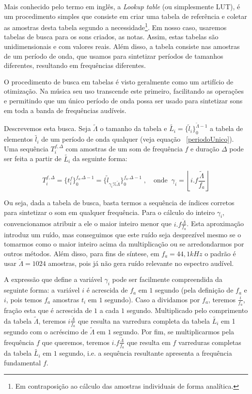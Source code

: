 Mais conhecido pelo termo em inglês, a \emph{Lookup table} (ou simplesmente
LUT), é um procedimento simples que consiste em criar uma tabela
de referência e coletar as amostras desta tabela segundo a 
necessidade\footnote{Em contraposição ao cálculo das amostras individuais
de forma analítica.}. Em nosso caso, usaremos tabelas de busca para os
sons criados, as notas. Assim, estas tabelas são unidimensionais e com
valores reais. Além disso, a tabela consiste nas amostras
de um período de onda, que usamos para sintetizar períodos
de tamanhos diferentes, resultando em frequências diferentes.

O procedimento de busca em tabelas é visto geralmente como um
artifício de otimização. Na música seu uso transcende este
primeiro, facilitando as operações e permitindo que um único
período de onda possa ser usado para sintetizar sons em toda a banda
de frequências audíveis.

Descrevemos esta busca. Seja $\widetilde{\Lambda}$ o tamanho 
da tabela e $\widetilde{L_i} = \{ \widetilde{l}_i \}_0^{\widetilde{\Lambda} -1}$ a tabela de elementos $\widetilde{l_i}$ de um
período de onda qualquer (veja equação ~\ref{periodoUnico}). Uma sequência
$T_i^{f,\Delta}$ com amostras de um som de frequência $f$ e duração $\Delta$
pode ser feita a partir de $\widetilde{L_i}$ da seguinte forma:

\begin{equation}
T_i^{f,\Delta}=\{t_i^f\}_0^{f_a . \Delta-1} = \{ \widetilde{l}_{\gamma_i \% \widetilde{\Lambda} } \}_{0}^{f_a . \Delta-1}\; , \quad \text{onde} \;\; \gamma_i = \left \lfloor i . f \frac{ \widetilde{\Lambda}}{f_a} \right \rfloor  
\end{equation}

Ou seja, dada a tabela de busca, basta termos a sequência de índices corretos
para sintetizar o som em qualquer frequência. Para o cálculo do inteiro $\gamma_i$, convencionamos
atribuir a ele o maior inteiro menor que $i.f\frac{\widetilde{\Lambda}}{f_a}$.
Esta aproximação introduz um ruído, mas conseguimos que este ruído seja desprezível
mesmo se o tomarmos como o maior inteiro acima da multiplicação
ou se arredondarmos por outros métodos. Além disso, para fins de síntese, em $f_a=44,1 kHz$
 o padrão é usar $\widetilde{\Lambda} = 1024$ amostras, pois já não gera ruído
 relevante no espectro audível.

 A expressão que define a variável $\gamma_i$ pode ser facilmente compreendida da
 seguinte forma: a variável $i$ é acrescida de $f_a$ em $1$ segundo (pela
 definição de $f_a$ e $i$, pois temos $f_a$ amostras $t_i$ em $1$ segundo). Caso a dividamos por $f_a$, teremos $\frac{i}{f_a}$,
fração esta que é acrescida de $1$ a cada $1$ segundo. Multiplicado pelo comprimento da
 tabela $\widetilde{\Lambda}$, teremos $i \frac{\widetilde{\Lambda}}{f_a}$
 que resulta na varredura completa da tabela $\widetilde{L_i}$ em 
 1 segundo com o acréscimo de $\widetilde{\Lambda}$ em $1$ segundo. Por fim,
 se multiplicarmos pela frequência $f$ que queremos, teremos $i . f \frac{\widetilde{\Lambda}}{f_a}$
 que resulta em $f$ varreduras completas da tabela $\widetilde{L_i}$ em $1$ segundo, i.e. a sequência
 resultante apresenta a frequência fundamental $f$.

